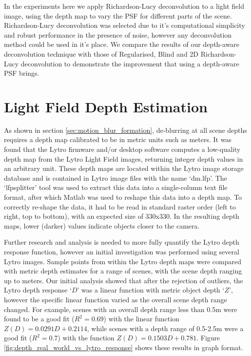 In the experiments here we apply Richardson-Lucy deconvolution to a light field image, using the depth map to vary the PSF for different parts of the scene.
Richardson-Lucy deconvolution was selected due to it's computational simplicity and robust performance in the presence of noise, however any deconvolution method could be used in it's place.
We compare the results of our depth-aware deconvolution technique with those of Regularised, Blind and 2D Richardson-Lucy deconvolution to demonstrate the improvement that using a depth-aware PSF brings.

\section{Light Field Depth Estimation}
\label{sec:light_field_depth_estimation}

As shown in section \ref{sec:motion_blur_formation}, de-blurring at all scene depths requires a depth map calibrated to be in metric units such as meters.
It was found that the Lytro firmware and/or desktop software computes a low-quality depth map from the Lytro Light Field images, returning integer depth values in an arbitrary unit.
These depth maps are located within the Lytro image storage database and is contained in Lytro image files with the name \enquote*{dm.lfp}.
The \enquote*{lfpsplitter} tool \cite{patel2013lfptools} was used to extract this data into a single-column text file format, after which Matlab was used to reshape this data into a depth map.
To correctly re-shape the data, it had to be read in standard raster order (left to right, top to bottom), with an expected size of 330x330.
In the resulting depth maps, lower (darker) values indicate objects closer to the camera.

Further research and analysis is needed to more fully quantify the Lytro depth response function, however an initial investigation was performed using several Lytro images.
Sample points from within the Lytro depth maps were compared with metric depth estimates for a range of scenes, with the scene depth ranging up to  meters.
Our initial analysis showed that after the rejection of outliers, the Lytro depth response \enquote*{$D$} was a linear function with metric object depth \enquote*{$Z$}, however the specific linear function varied as the overall scene depth range changed.
For example, scenes with an overall depth range less than 0.5m were found to be a good fit ($R^2 = 0.69$) with the linear function $Z(D) = 0.0291 D + 0.2114$, while scenes with a depth range of 0.5-2.5m were a good fit ($R^2 = 0.7$) with the function $Z(D) = 0.1503 D + 0.781$.
Figure \ref{fig:depth_real_world_vs_lytro_response} shows these results in graph format.

